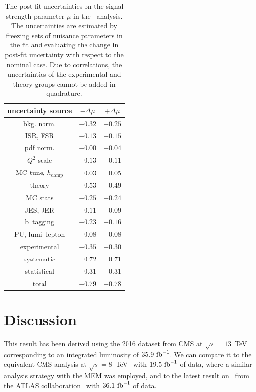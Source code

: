 \begin{table}
\begin{center}
\begin{tabular}{c|cc}
uncertainty source & $-\Delta\mu$ & $+\Delta\mu$ \\
\hline
bkg. norm. & $-0.32$ & $+0.25$\\
ISR, FSR & $-0.13$ & $+0.15$\\
pdf norm. & $-0.00$ & $+0.04$\\
$Q^2$ scale & $-0.13$ & $+0.11$\\
MC tune, $h_{\mathrm{damp}}$ & $-0.03$ & $+0.05$\\
\hline
theory & $-0.53$ & $+0.49$\\
\hline
MC stats & $-0.25$ & $+0.24$\\
JES, JER & $-0.11$ & $+0.09$\\
b~tagging & $-0.23$ & $+0.16$\\
PU, lumi, lepton & $-0.08$ & $+0.08$\\
\hline
experimental & $-0.35$ & $+0.30$\\
\hline
systematic & $-0.72$ & $+0.71$\\
statistical & $-0.31$ & $+0.31$\\
total & $-0.79$ & $+0.78$\\
\hline
\hline
\end{tabular}
\caption[The post-fit uncertainties in the~\ttHbb\xspace analysis]{The post-fit uncertainties on the signal strength parameter $\mu$ in the~\ttHbb\xspace analysis. The uncertainties are estimated by freezing sets of nuisance parameters in the fit and evaluating the change in post-fit uncertainty with respect to the nominal case. Due to correlations, the uncertainties of the experimental and theory groups cannot be added in quadrature.}
\label{tab:systematic_uncertainties_posterior}
\end{center}
\end{table}

\section{Discussion}
\label{sec:tth_discussion}
This result has been derived using the 2016 dataset from CMS at $\sqrt{s} = 13$~TeV corresponding to an integrated luminosity of $35.9~\mathrm{fb}^{-1}$. We can compare it to the equivalent CMS analysis at $\sqrt{s} = 8$~TeV~\cite{Khachatryan:2015ila} with $19.5~\mathrm{fb}^{-1}$ of data, where a similar analysis strategy with the MEM was employed, and to the latest result on \ttHbb~from the ATLAS collaboration~\cite{ATLAS:2017nkr} with $36.1~\mathrm{fb}^{-1}$ of data.

